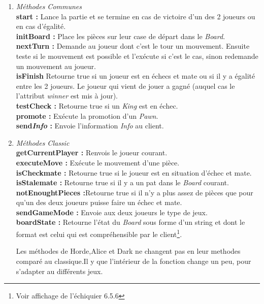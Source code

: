 \documentclass[10pt, a4paper]{article}
\begin{document}
\begin{enumerate}

\item \textit{Méthodes Communes} \\
\textbf{start :} Lance la partie et se termine en cas de victoire d'un des 2 joueurs ou en cas d'égalité. \\
\textbf{initBoard :} Place les pièces sur leur case de départ dans le \textit{Board}. \\
\textbf{nextTurn :} Demande au joueur dont c'est le tour un mouvement. Ensuite teste si le mouvement est possible et l'exécute si c'est le cas, sinon redemande un mouvement au joueur. \\
\textbf{isFinish} Retourne true si un joueur est en échecs et mate ou si il y a égalité entre les 2 joueurs. Le joueur qui vient de jouer a gagné  (auquel cas le l'attribut \textit{winner} est mis à jour). \\
\textbf{testCheck :} Retourne true si un \textit{King} est en échec. \\
\textbf{promote :} Exécute la promotion d'un \textit{Pawn}.\\
\textbf{send\textsl{Info} :} Envoie l'information \textsl{Info} au client.\\

\item \textit{Méthodes Classic } \\
\textbf{getCurrentPlayer :} Renvois le joueur courant.\\
\textbf{executeMove :} Exécute le mouvement d'une pièce.\\
\textbf{isCheckmate :} Retourne true si le joueur est en situation d'échec et mate.\\
\textbf{isStalemate :} Retourne true si il y a un pat dans le \textit{Board} courant.\\
\textbf{notEnoughtPieces :}Retourne true si il n'y a plus assez de pièces que pour qu'un des deux joueurs puisse faire un échec et mate.\\
\textbf{sendGameMode :} Envoie aux deux joueurs le type de jeux.\\
\textbf{boardState :} Retourne l'état du \textit{Board} sous forme d'un string et dont le format est celui qui est compréhensible par le client\footnote{Voir affichage de l'échiquier 6.5.6}.

Les méthodes de Horde,Alice et Dark ne changent pas en leur methodes comparé au classique.Il y que l'intérieur de la fonction change un peu, pour s'adapter au différents jeux.


\end{enumerate}
\end{document}
